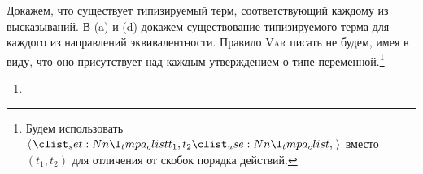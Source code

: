 \documentclass{article}
\DeclareMathOperator{\tstl}{\ \vdash\ }
\begin{document}
\begin{enumerate}
    \begin{mdframed}
        Докажем, что существует типизируемый терм, соответствующий каждому из высказываний. В (a) и (d) докажем существование типизируемого терма для каждого из направлений эквивалентности. Правило \textsc{Var} писать не будем, имея в виду, что оно присутствует над каждым утверждением о типе переменной.\footnote{Будем использовать $\opair{t_1,t_2}$ вместо $(t_1, t_2)$ для отличения от скобок порядка действий.}
        \begin{enumerate}[itemsep=12pt]
            \item {}
\end{enumerate}
\end{mdframed}
\end{enumerate}
\end{document}
